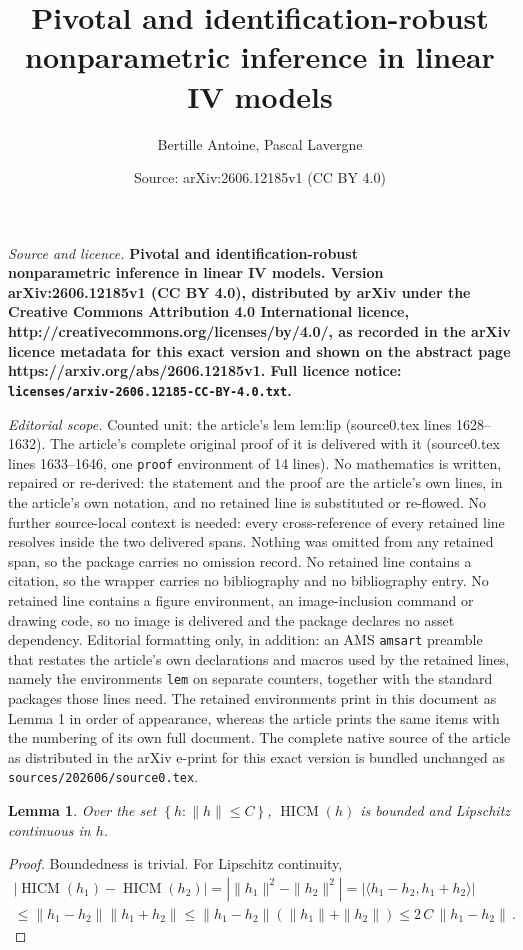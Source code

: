 \documentclass[10pt,a4paper]{amsart}
\title{\bf Pivotal and identification-robust \\nonparametric inference in linear IV models}
\author{Bertille Antoine, Pascal Lavergne}
\date{Source: arXiv:2606.12185v1 (CC BY 4.0)}
\newtheorem{lem}{Lemma}
\newcommand{\HICM}{\operatorname{HICM}}
\newcommand{\ip}[2]{\langle #1,#2 \rangle}
\begin{document}
\maketitle

\noindent\emph{Source and licence.} \bf Pivotal and identification-robust \\nonparametric inference in linear IV models. Version arXiv:2606.12185v1 (CC BY 4.0), distributed by arXiv under the Creative Commons Attribution 4.0 International licence, http://creativecommons.org/licenses/by/4.0/, as recorded in the arXiv licence metadata for this exact version and shown on the abstract page https://arxiv.org/abs/2606.12185v1. Full licence notice: \texttt{licenses/arxiv-2606.12185-CC-BY-4.0.txt}.\par\smallskip

\noindent\textit{Editorial scope.} Counted unit: the article's lem lem:lip (source0.tex lines 1628--1632). The article's complete original proof of it is delivered with it (source0.tex lines 1633--1646, one \texttt{proof} environment of 14 lines). No mathematics is written, repaired or re-derived: the statement and the proof are the article's own lines, in the article's own notation, and no retained line is substituted or re-flowed.  No further source-local context is needed: every cross-reference of every retained line resolves inside the two delivered spans.  Nothing was omitted from any retained span, so the package carries no omission record.  No retained line contains a citation, so the wrapper carries no bibliography and no bibliography entry.  No retained line contains a figure environment, an image-inclusion command or drawing code, so no image is delivered and the package declares no asset dependency.  Editorial formatting only, in addition: an AMS \texttt{amsart} preamble that restates the article's own declarations and macros used by the retained lines, namely the environments \texttt{lem} on separate counters, together with the standard packages those lines need.  The retained environments print in this document as Lemma 1 in order of appearance, whereas the article prints the same items with the numbering of its own full document.  The complete native source of the article as distributed in the arXiv e-print for this exact version is bundled unchanged as \texttt{sources/202606/source0.tex}.
\begin{lem}
Over the set $\left\{ h : \|h\| \leq C\right\}$,
 $\HICM (h)$ is bounded and Lipschitz continuous in $h$.
\label{lem:lip}
\end{lem}

\begin{proof}
Boundedness is trivial. For Lipschitz continuity,
\begin{multline*}
\left| \HICM (h_{1}) - \HICM (h_{2}) \right|
= \left| \|h_{1}\|^{2} - \|h_{2}\|^{2} \right|
 = \left| \ip{h_{1}-h_{2}}{h_{1} + h_{2}} \right|
\\
 \leq \|h_{1} - h_{2} \| \|h_{1} + h_{2}\|
 \leq \|h_{1} - h_{2} \| ( \|h_{1}\| + \|h_{2}\| ) \leq 2\, {C} \,
\|h_{1} - h_{2} \|
\, .
\tag*{\qedhere}
\end{multline*}
\end{proof}
\end{document}
